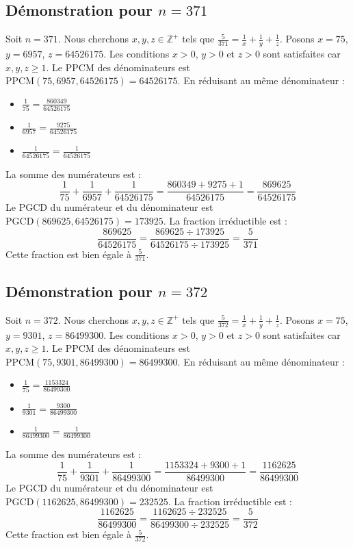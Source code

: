 \documentclass[11pt,a4paper]{article}
\begin{document}
\subsection{Démonstration pour $n = 371$}
Soit $n = 371$. Nous cherchons $x, y, z \in \mathbb{Z}^{+}$ tels que $\frac{5}{371} = \frac{1}{x} + \frac{1}{y} + \frac{1}{z}$.
Posons $x = 75$, $y = 6957$, $z = 64526175$.
Les conditions $x > 0$, $y > 0$ et $z > 0$ sont satisfaites car $x, y, z \geq 1$.
Le PPCM des dénominateurs est $\text{PPCM}(75, 6957, 64526175) = 64526175$.
En réduisant au même dénominateur :
\begin{itemize}
    \item $\frac{1}{75} = \frac{860349}{64526175}$
    \item $\frac{1}{6957} = \frac{9275}{64526175}$
    \item $\frac{1}{64526175} = \frac{1}{64526175}$
\end{itemize}
La somme des numérateurs est :
$$ \frac{1}{75} + \frac{1}{6957} + \frac{1}{64526175} = \frac{860349 + 9275 + 1}{64526175} = \frac{869625}{64526175} $$
Le PGCD du numérateur et du dénominateur est $\text{PGCD}(869625, 64526175) = 173925$.
La fraction irréductible est :
$$ \frac{869625}{64526175} = \frac{869625 \div 173925}{64526175 \div 173925} = \frac{5}{371} $$
Cette fraction est bien égale à $\frac{5}{371}$.

\subsection{Démonstration pour $n = 372$}
Soit $n = 372$. Nous cherchons $x, y, z \in \mathbb{Z}^{+}$ tels que $\frac{5}{372} = \frac{1}{x} + \frac{1}{y} + \frac{1}{z}$.
Posons $x = 75$, $y = 9301$, $z = 86499300$.
Les conditions $x > 0$, $y > 0$ et $z > 0$ sont satisfaites car $x, y, z \geq 1$.
Le PPCM des dénominateurs est $\text{PPCM}(75, 9301, 86499300) = 86499300$.
En réduisant au même dénominateur :
\begin{itemize}
    \item $\frac{1}{75} = \frac{1153324}{86499300}$
    \item $\frac{1}{9301} = \frac{9300}{86499300}$
    \item $\frac{1}{86499300} = \frac{1}{86499300}$
\end{itemize}
La somme des numérateurs est :
$$ \frac{1}{75} + \frac{1}{9301} + \frac{1}{86499300} = \frac{1153324 + 9300 + 1}{86499300} = \frac{1162625}{86499300} $$
Le PGCD du numérateur et du dénominateur est $\text{PGCD}(1162625, 86499300) = 232525$.
La fraction irréductible est :
$$ \frac{1162625}{86499300} = \frac{1162625 \div 232525}{86499300 \div 232525} = \frac{5}{372} $$
Cette fraction est bien égale à $\frac{5}{372}$.
\end{document}

